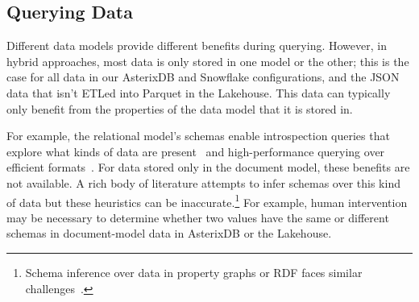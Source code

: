 \vspace{-0.8em}
\subsection{Querying Data} \label{ss:hybrid_querying}

Different data models provide different benefits during querying. However, in hybrid approaches, most data is only stored in one model or the other; this is the case for all data in our AsterixDB and Snowflake configurations, and the JSON data that isn't ETLed into Parquet in the Lakehouse. This data can typically only benefit from the properties of the data model that it is stored in.

For example, the relational model's schemas enable introspection queries that explore what kinds of data are present~\cite{aurum} and high-performance querying over efficient formats~\cite{snowflake, parquet, dremel, cstore}. For data stored only in the document model, these benefits are not available.
A rich body of literature attempts to infer schemas over this kind of data but these heuristics can be inaccurate.\footnote{Schema inference over data in property graphs or RDF faces similar challenges~\cite{deriving_rdf_schema, neo4j}.} For example, human intervention may be necessary to determine whether two values have the same or different schemas in document-model data in AsterixDB or the Lakehouse.


